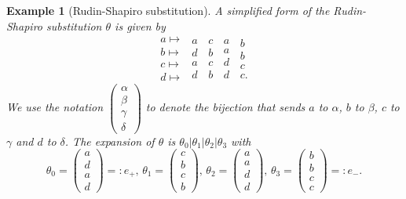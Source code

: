 \documentclass[10pt,a4paper]{amsart}
\newtheorem{example}[theorem]{Example}
\numberwithin{equation}{section}
\renewcommand{\a}{{\color{blue}\boxdot}}
\renewcommand{\c}{{\color{red}\boxminus}}
\renewcommand{\b}{{\color{orange}\boxplus}}
\begin{document}
\begin{example}[Rudin-Shapiro substitution] \label{ex:RS} A simplified form of
the Rudin-Shapiro substitution $\theta$ is given by  
\[
\begin{array}{c} a \mapsto\\ b\mapsto\\ c\mapsto\\ d\mapsto \end{array} 
\begin{array}{c} a\,\\ d\,\\ a\,\\ d\, \end{array}
\!\!\!\!\!\!{\begin{array}{c} c\,\\ b\,\\ c\,\\ b\, \end{array}}
\!\!\!\!\!\!{\begin{array}{c} a\,\\ a\,\\ d\,\\ d\, \end{array}}
\!\!\!\!\!\!{\begin{array}{c} b\,\\ b\,\\ c\,\\ c. \end{array}}
\]
We use the notation $\begin{pmatrix}
           \alpha \\
           \beta \\
           \gamma \\ \delta
          \end{pmatrix} $
to denote the bijection that sends $a$ to $\alpha$, $b$ to $\beta$, $c$ to $\gamma$ and $d$ to $\delta$.
The expansion of $\theta$ is $\theta_0|\theta_1|\theta_2|\theta_3$ with \[\theta_0 = \begin{pmatrix} a\\d\\a\\d \end{pmatrix}=:e_+,  \, 
\theta_1 =  
\begin{pmatrix} 
c\\b\\c\\b \end{pmatrix}, \,\theta_2 =  \begin{pmatrix} a\\a\\d\\d \end{pmatrix} , \,\theta_3 =  \begin{pmatrix} b\\b\\c\\c \end{pmatrix}=:e_-.\]

\end{example}
\end{document}
